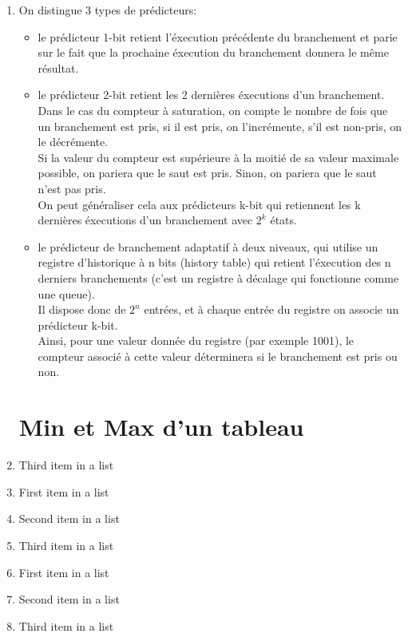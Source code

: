 \documentclass[paper=a4, fontsize=11pt]{scrartcl}
\numberwithin{equation}{section}		%
\numberwithin{figure}{section}			%
\numberwithin{table}{section}				%
\begin{document}
\begin{enumerate}
	\item 

On distingue 3 types de prédicteurs: \\
\begin{itemize}
\item le prédicteur 1-bit retient l'éxecution précédente du branchement et parie sur le fait que la prochaine
éxecution du branchement donnera le même résultat. \\

\item le prédicteur 2-bit retient les 2 dernières éxecutions d'un branchement. \\
Dans le cas du compteur à saturation, on compte le nombre de fois que un branchement est pris, si il est pris,
on l'incrémente, s'il est non-pris, on le décrémente. \\
Si la valeur du compteur est supérieure à la moitié de sa valeur maximale possible, on pariera que le saut est pris.
Sinon, on pariera que le saut n'est pas pris.\\
On peut généraliser cela aux prédicteurs k-bit qui retiennent les k dernières éxecutions d'un branchement avec \(2^k\) états. \\

\item le prédicteur de branchement adaptatif à deux niveaux, qui utilise un registre d'historique à n bits (history table)
qui retient l'éxecution des n derniers branchements (c'est un registre à décalage qui fonctionne comme une queue). \\
Il dispose donc de \(2^n\) entrées, et à chaque entrée du registre on associe un prédicteur k-bit. \\
Ainsi, pour une valeur donnée du registre (par exemple 1001), le compteur associé à cette valeur déterminera
si le branchement est pris ou non.

\end{itemize}


\section{Min et Max d’un tableau}
	\item Third item in a list
   	\item First item in a list
	\item Second item in a list
	\item Third item in a list
    \item First item in a list
	\item Second item in a list
	\item Third item in a list


\end{enumerate}
\end{document}

